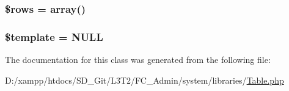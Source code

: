 \subsubsection[{\$rows}]{\setlength{\rightskip}{0pt plus 5cm}\$rows = array()}\label{class_c_i___table_ace2ec39e7df3899fa8df9640ec274b03}
\hypertarget{class_c_i___table_aa3e9534005fd516d941f6a5569896e01}{}
\subsubsection[{\$template}]{\setlength{\rightskip}{0pt plus 5cm}\$template = N\+U\+L\+L}\label{class_c_i___table_aa3e9534005fd516d941f6a5569896e01}


The documentation for this class was generated from the following file\+:\begin{DoxyCompactItemize}
\item 
D\+:/xampp/htdocs/\+S\+D\+\_\+\+Git/\+L3\+T2/\+F\+C\+\_\+\+Admin/system/libraries/\hyperlink{system_2libraries_2_table_8php}{Table.\+php}\end{DoxyCompactItemize}
